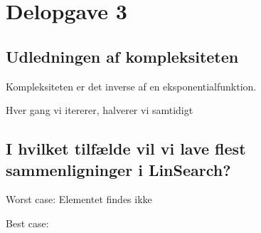 \section{Delopgave 3}\label{sec:delopgave-32}

\subsection{Udledningen af kompleksiteten}\label{subsec:udledningen-af-kompleksiteten}

Kompleksiteten er det inverse af en eksponentialfunktion.

Hver gang vi itererer, halverer vi samtidigt

\subsection{I hvilket tilfælde vil vi lave flest sammenligninger i LinSearch?}
\label{subsec:i-hvilket-tilflde-vil-vi-lave-flest-sammenligninger-i-linsearch?}

Worst case: Elementet findes ikke

Best case:
